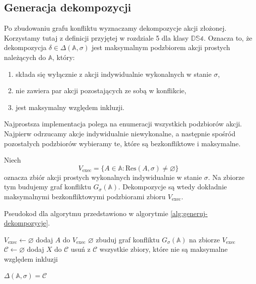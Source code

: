 \documentclass[11pt,a4paper]{article}
\theoremstyle{definition}
\begin{document}
\subsection{Generacja dekompozycji}
\label{sec:alg-dekompozycje}

Po zbudowaniu grafu konfliktu wyznaczamy dekompozycje akcji złożonej. Korzystamy tutaj z definicji przyjętej w rozdziale 5 dla klasy $\mathbb{DS4}$. Oznacza to, że dekompozycja $\delta \in \Delta(\mathbb{A},\sigma)$ jest maksymalnym podzbiorem akcji prostych należących do $\mathbb{A}$, który:
\begin{enumerate}
    \item składa się wyłącznie z akcji indywidualnie wykonalnych w stanie $\sigma$,
    \item nie zawiera par akcji pozostających ze sobą w konflikcie,
    \item jest maksymalny względem inkluzji.
\end{enumerate}

Najprostsza implementacja polega na enumeracji wszystkich podzbiorów akcji. Najpierw odrzucamy akcje indywidualnie niewykonalne, a następnie spośród pozostałych podzbiorów wybieramy te, które są bezkonfliktowe i maksymalne.

Niech
\[
V_{\mathrm{exec}} = \{A \in \mathbb{A} : \mathrm{Res}(A,\sigma)\neq\varnothing\}
\]
oznacza zbiór akcji prostych wykonalnych indywidualnie w stanie $\sigma$. Na zbiorze tym budujemy graf konfliktu $G_{\sigma}(\mathbb{A})$. Dekompozycje są wtedy dokładnie maksymalnymi bezkonfliktowymi podzbiorami zbioru $V_{\mathrm{exec}}$.

Pseudokod dla algorytmu przedstawiono w algorytmie \ref{alg:generuj-dekompozycje}.

\begin{algorithm}[H]
\caption{Pseudokod dla algorytmu generującego dekompozycje}
\label{alg:generuj-dekompozycje}
\begin{algorithmic}[1]
        \State $V_{\mathrm{exec}} \leftarrow \varnothing$
                \State dodaj $A$ do $V_{\mathrm{exec}}$
            \EndIf
        \EndFor
            \Return $\varnothing$
        \EndIf
        \State zbuduj graf konfliktu $G_{\sigma}(\mathbb{A})$ na zbiorze $V_{\mathrm{exec}}$
        \State $\mathcal{C} \leftarrow \varnothing$
                \State dodaj $X$ do $\mathcal{C}$
            \EndIf
        \EndFor
        \State usuń z $\mathcal{C}$ wszystkie zbiory, które nie są maksymalne względem inkluzji
        
        \Return $\Delta(\mathbb{A},\sigma) = \mathcal{C}$
    \EndProcedure
\end{algorithmic}
\end{algorithm}
\end{document}
